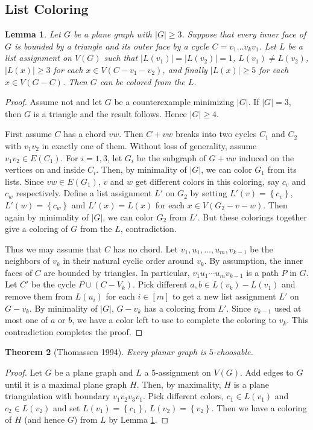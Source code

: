 \documentclass[12pt]{article}
\theoremstyle{plain}
\newtheorem{thm}{Theorem}
\newtheorem{lem}[thm]{Lemma}
\theoremstyle{definition}
\theoremstyle{remark}
\newcommand{\set}[1]{\left\{ #1 \right\}}
\newcommand{\card}[1]{\left|#1\right|}
\begin{document}
\subsection{List Coloring}
\begin{lem}\label{ThomassenPrecursor}
Let $G$ be a plane graph with $\card{G} \geq 3$.  Suppose that every inner face of $G$ is bounded by a triangle and its outer face by a cycle $C = v_1\ldots v_kv_1$.  Let $L$ be a list assignment on $V(G)$ such that $\card{L(v_1)} = \card{L(v_2)} = 1$, $L(v_1) \neq L(v_2)$, $\card{L(x)} \geq 3$ for each $x \in V(C-v_1-v_2)$, and finally $\card{L(x)} \geq 5$ for each $x \in V(G - C)$.  Then $G$ can be colored from the $L$.
\end{lem}
\begin{proof}
Assume not and let $G$ be a counterexample minimizing $\card{G}$. If $\card{G} = 3$, then $G$ is a triangle and the result follows.  Hence $\card{G} \geq 4$.

First assume $C$ has a chord $vw$.  Then $C + vw$ breaks into two cycles $C_1$ and $C_2$ with $v_1v_2$ in exactly one of them.  Without loss of generality, assume $v_1v_2 \in E(C_1)$.  For $i = 1,3$, let $G_i$ be the subgraph of $G + vw$ induced on the vertices on and inside $C_i$.  Then, by minimality of $\card{G}$, we can color $G_1$ from its lists.  Since $vw \in E(G_1)$, $v$ and $w$ get different colors in this coloring, say $c_v$ and $c_w$ respectively.  Define a list assignment $L'$ on $G_2$ by setting $L'(v) = \set{c_v}$, $L'(w) = \set{c_w}$ and $L'(x) = L(x)$ for each $x \in V(G_2 - v - w)$.  Then again by minimality of $\card{G}$, we can color $G_2$ from $L'$.  But these colorings together give a coloring of $G$ from the $L$, contradiction.

Thus we may assume that $C$ has no chord.  Let $v_1, u_1, \ldots, u_m, v_{k-1}$ be the neighbors of $v_k$ in their natural cyclic order around $v_k$.  By assumption, the inner faces of $C$ are bounded by triangles.  In particular, $v_1u_1\cdots u_mv_{k-1}$ is a path $P$ in $G$.  Let $C'$ be the cycle $P \cup (C-V_k)$.  Pick different $a,b \in L(v_k) - L(v_1)$ and remove them from $L(u_i)$ for each $i \in [m]$ to get a new list assignment $L'$ on $G - v_k$.  By minimality of $\card{G}$, $G-v_k$ has a coloring from $L'$.  Since $v_{k-1}$ used at most one of $a$ or $b$, we have a color left to use to complete the coloring to $v_k$.  This contradiction completes the proof.
\end{proof}

\begin{thm}[Thomassen 1994]
Every planar graph is $5$-choosable.
\end{thm}
\begin{proof}
Let $G$ be a plane graph and $L$ a $5$-assignment on $V(G)$. Add edges to $G$ until it is a maximal plane graph $H$.  Then, by maximality, $H$ is a plane triangulation with boundary $v_1v_2v_3v_1$.  Pick different colors, $c_1 \in L(v_1)$ and $c_2 \in L(v_2)$ and set $L(v_1) = \set{c_1}$, $L(v_2) = \set{v_2}$.  Then we have a coloring of $H$ (and hence $G$) from $L$ by Lemma \ref{ThomassenPrecursor}.
\end{proof}
\end{document}
